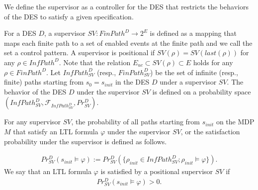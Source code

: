 We define the supervisor as a controller for the DES that restricts the behaviors of the DES to satisfy a given specification.

\begin{definition}[Supervisor]
For a DES $D$, a supervisor $SV : FinPath^{D} \rightarrow 2^E$ is defined as a mapping that maps each finite path to a set of enabled events at the finite path and we call the set a control pattern. A supervisor is positional if $SV(\rho) = SV(last(\rho))$ for any $\rho \in InfPath^D$. Note that the relation $E_{uc} \subset SV(\rho) \subset E$ holds for any $\rho \in FinPath^D$.
Let $InfPath^{D}_{SV}$ (resp., $FinPath^{D}_{SV}$) be the set of infinite (resp., finite) paths starting from $s_0=s_{init}$ in the DES $D$ under a supervisor $SV$. The behavior of the DES $D$ under the supervisor $SV$ is defined on a probability space $(InfPath^{D}_{SV}, \mathcal{F}_{InfPath^{D}_{SV}}, Pr^{D}_{SV})$.
\end{definition}

For any supervisor $SV$, the probability of all paths starting from $s_{init}$ on the MDP $M$ that satisfy an LTL formula $\varphi$ under the supervisor $SV$, or the satisfaction probability under the supervisor is defined as follows.

\begin{align*}
Pr^{D}_{SV}(s_{init} \! \models \varphi) := Pr^{D}_{SV}(\{ \rho_{init} \! \in \! InfPath^{D}_{SV} ; \rho_{init} \! \models \varphi \}).
\end{align*}
We say that an LTL formula $\varphi$ is satisfied by a positional supervisor $SV$ if
\begin{align*}
Pr^{D}_{SV}(s_{init} \models \varphi) > 0.
\end{align*}


